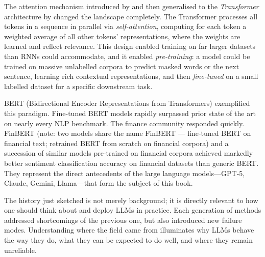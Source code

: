 \begin{context}
The attention mechanism introduced by \citet{bahdanau2015neural} %
and then generalised to the \emph{Transformer} architecture by \citet{vaswani2017attention} %
changed the landscape completely.  The Transformer processes all tokens in a sequence in
parallel via \emph{self-attention}, computing for each token a weighted average of all
other tokens' representations, where the weights are learned and reflect relevance.
This design enabled training on far larger datasets than RNNs could accommodate, and it
enabled \emph{pre-training}: a model could be trained on massive unlabelled corpora to
predict masked words or the next sentence, learning rich contextual representations,
and then \emph{fine-tuned} on a small labelled dataset for a specific downstream task.

BERT (Bidirectional Encoder Representations from Transformers)
\cite{devlin2019} %
exemplified this paradigm.  Fine-tuned BERT models rapidly surpassed prior state of the
art on nearly every NLP benchmark.  The finance community responded quickly.
FinBERT \cite{araci2019finbert,yang2020finbert}
(note: two models share the name FinBERT — \citeauthor{araci2019finbert}
fine-tuned BERT on financial text; \citeauthor{yang2020finbert} retrained BERT from
scratch on financial corpora) and a succession of similar models pre-trained on
financial corpora achieved markedly better sentiment classification accuracy on
financial datasets than generic BERT.  They
represent the direct antecedents of the large language models---GPT-5, Claude, Gemini,
Llama---that form the subject of this book.

The history just sketched is not merely background; it is directly relevant to how one
should think about and deploy LLMs in practice.  Each generation of methods addressed
shortcomings of the previous one, but also introduced new failure modes.  Understanding
where the field came from illuminates why LLMs behave the way they do, what they can be
expected to do well, and where they remain unreliable.

\end{context}

